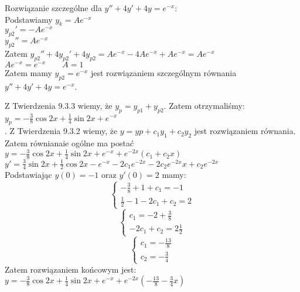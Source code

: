 \documentclass[10pt,a4paper]{article}
\begin{document}
    Rozwiązanie szczególne dla  $y'' +4y' + 4y = e^{-x} $: \\
    Podstawiamy $y_{k} = Ae^{-x} $ \\
    $y_{p2}' = -Ae^{-x} $\\
    $y_{p2}'' = Ae^{-x} $\\
    Zatem $y_{p2}'' +4y_{p2}' + 4y_{p2} = Ae^{-x} - 4Ae^{-x} + Ae^{-x} = Ae^{-x} $ \\
    $Ae^{-x} = e^{-x} \qquad A=1$ \\
    Zatem mamy $y_{p2} = e^{-x}$ jest rozwiązaniem szczególnym równania \\ $y'' +4y' + 4y = e^{-x} $.
    
    Z Twierdzenia 9.3.3 wiemy, że $y_{p} = y_{p1} + y_{p2} $. Zatem otrzymaliśmy: \\
    $y_{p}= -\frac{3}{8}\cos 2x + \frac{1}{4} \sin 2x + e^{-x} $ \\.
    Z Twierdzenia 9.3.2 wiemy, że $y = yp + c_{1}y_{1} + c_{2}y_{2} $ jest rozwiązaniem równania.\\
    Zatem równianaie ogólne ma postać\\
    $y = -\frac{3}{8}\cos 2x + \frac{1}{4} \sin 2x + e^{-x} + e^{-2x}(c_{1} + c_{2}x)$ \\
    $y' = \frac{3}{4}\sin 2x + \frac{1}{2} \cos 2x - e^{-x} - 2c_{1}e^{-2x} - 2c_{2}e^{-2x}x + c_{2}e^{-2x}$ \\
    \newpage
    Podstawiając $y(0) = -1 $ oraz $y'(0) = 2$ mamy: \\
    $$ 
    \left\{ \begin{array}{l}
    -\frac{3}{8} + 1 + c_{1}  = -1 \\
     \frac{1}{2}  - 1 - 2c_{1} + c_{2} = 2
    \end{array}\right. 
    $$
     $$ 
    \left\{ \begin{array}{l}
     c_{1}  = -2 + \frac{3}{8} \\
    -2c_{1} + c_{2} = 2\frac{1}{2}
  	\end{array}\right. 
	$$
	 $$ 
	\left\{ \begin{array}{l}
	c_{1}  = -\frac{13}{8} \\
	c_{2} = -\frac{3}{4}
	\end{array}\right. 
	$$
	Zatem rozwiązaniem końcowym jest: \\
	$y = -\frac{3}{8}\cos 2x + \frac{1}{4} \sin 2x + e^{-x} + e^{-2x}(-\frac{13}{8} - \frac{3}{4}x)$
    
    
    \newpage 
    
\end{document}
